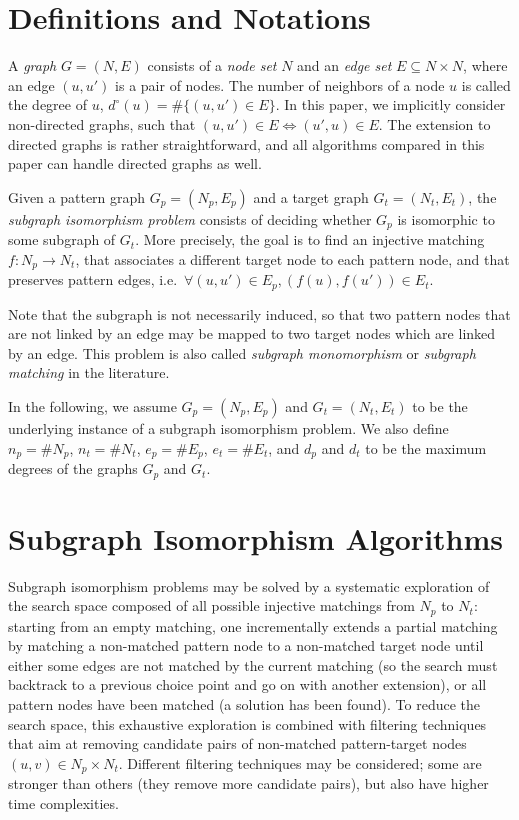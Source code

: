 \documentclass{llncs}
\begin{document}
\section{Definitions and Notations}

A \emph{graph} $G=(N,E)$ consists of a \emph{node set} $N$ and an \emph{edge set} $E \subseteq N
\times N$, where an edge $(u,u')$ is a pair of nodes. The number of neighbors of a node $u$ is
called the degree of $u$, $d^\circ(u)=\#\{ (u,u')\in E\}$. In this paper, we implicitly consider
non-directed graphs, such that $(u,u')\in E\Leftrightarrow (u',u)\in E$. The extension to directed
graphs is rather straightforward, and all algorithms compared in this paper can handle directed
graphs as well.

Given a pattern graph $G_p=(N_p,E_p)$ and a target graph $G_t=(N_t,E_t)$, the \emph{subgraph
isomorphism problem} consists of deciding whether $G_p$ is isomorphic to some subgraph of $G_t$.
More precisely, the goal is to find an injective matching $f: N_p\rightarrow N_t$, that associates a
different target node to each pattern node, and that preserves pattern edges, i.e.\ $\forall (u,u')
\in E_p, (f(u),f(u')) \in E_t$.

Note that the subgraph is not necessarily induced, so that two pattern nodes that are not linked by
an edge may be mapped to two target nodes which are linked by an edge. This problem is also called
\emph{subgraph monomorphism} or \emph{subgraph matching} in the literature.

In the following, we assume $G_p=(N_p,E_p)$ and $G_t=(N_t,E_t)$ to be the underlying instance of a
subgraph isomorphism problem.  We also define $n_p = \# N_p$, $n_t = \# N_t$,  $e_p=\# E_p$, $e_t=\#
E_t$, and $d_p$ and $d_t$ to be the maximum degrees of the graphs $G_p$ and $G_t$.

\section{Subgraph Isomorphism Algorithms}

Subgraph isomorphism problems may be solved by a systematic exploration of the search space composed
of all possible injective matchings from $N_p$ to $N_t$: starting from an empty matching, one
incrementally extends a partial matching by matching a non-matched pattern node to a non-matched
target node until either some edges are not matched by the current matching (so the search must
backtrack to a previous choice point and go on with another extension), or all pattern nodes have
been matched (a solution has been found). To reduce the search space, this exhaustive exploration is
combined with filtering techniques that aim at removing candidate pairs of non-matched
pattern-target nodes $(u,v)\in N_p\times N_t$. Different filtering techniques may be considered;
some are stronger than others (they remove more candidate pairs), but also have higher time
complexities.
\end{document}
